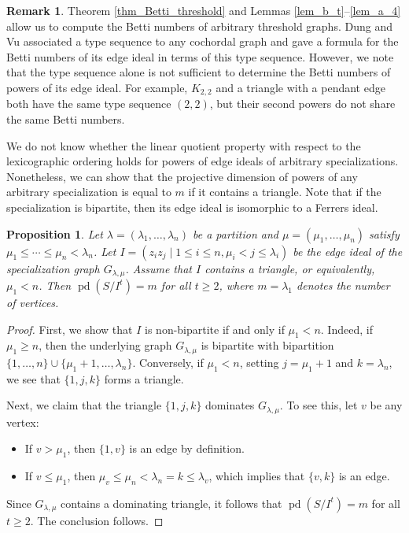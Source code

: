 \documentclass[12pt,amscd]{amsart}
\newtheorem{prop}[thm]{Proposition}
\theoremstyle{definition}
\newtheorem{rem}[thm]{Remark}
\numberwithin{equation}{section}
\DeclareMathOperator{\pd}{pd}
\begin{document}
\begin{rem}\label{rem_arbitrary_threshold} 
Theorem \ref{thm_Betti_threshold} and Lemmas \ref{lem_b_t}--\ref{lem_a_4} allow us to compute the Betti numbers of arbitrary threshold graphs. Dung and Vu \cite{DV} associated a type sequence to any cochordal graph and gave a formula for the Betti numbers of its edge ideal in terms of this type sequence. However, we note that the type sequence alone is not sufficient to determine the Betti numbers of powers of its edge ideal. For example, $K_{2,2}$ and a triangle with a pendant edge both have the same type sequence $(2,2)$, but their second powers do not share the same Betti numbers.
\end{rem}

We do not know whether the linear quotient property with respect to the lexicographic ordering holds for powers of edge ideals of arbitrary specializations. Nonetheless, we can show that the projective dimension of powers of any arbitrary specialization is equal to $m$ if it contains a triangle. Note that if the specialization is bipartite, then its edge ideal is isomorphic to a Ferrers ideal.

\begin{prop} \label{prop_pd}
Let $\lambda = (\lambda_1, \ldots, \lambda_n)$ be a partition and $\mu = (\mu_1, \ldots, \mu_n)$ satisfy $\mu_1 \le \cdots \le \mu_n < \lambda_n$. Let $I = (z_i z_j \mid 1 \le i \le n, \mu_i < j \le \lambda_i)$ be the edge ideal of the specialization graph $G_{\lambda, \mu}$. Assume that $I$ contains a triangle, or equivalently, $\mu_1 < n$. Then $\pd(S/I^t) = m$ for all $t \ge 2$, where $m = \lambda_1$ denotes the number of vertices.
\end{prop}

\begin{proof}
First, we show that $I$ is non-bipartite if and only if $\mu_1 < n$. Indeed, if $\mu_1 \ge n$, then the underlying graph $G_{\lambda, \mu}$ is bipartite with bipartition $\{1, \ldots, n\} \cup \{\mu_1 + 1, \ldots, \lambda_n\}$. Conversely, if $\mu_1 < n$, setting $j = \mu_1 + 1$ and $k = \lambda_n$, we see that $\{1, j, k\}$ forms a triangle.

Next, we claim that the triangle $\{1, j, k\}$ dominates $G_{\lambda, \mu}$. To see this, let $v$ be any vertex:
\begin{itemize}
    \item If $v > \mu_1$, then $\{1, v\}$ is an edge by definition.
    \item If $v \le \mu_1$, then $\mu_v \le \mu_n < \lambda_n = k \le \lambda_v$, which implies that $\{v, k\}$ is an edge.
\end{itemize}

Since $G_{\lambda, \mu}$ contains a dominating triangle, it follows that $\pd(S/I^t) = m$ for all $t \ge 2$. The conclusion follows.
\end{proof}
\end{document}
